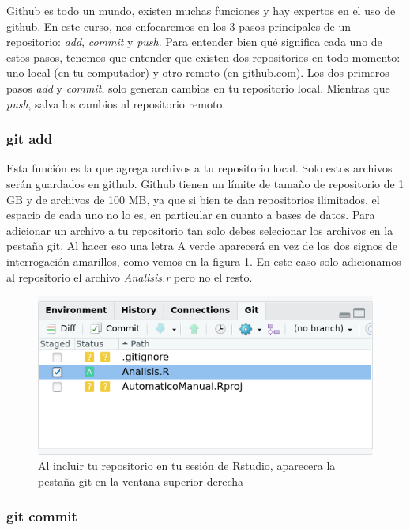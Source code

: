 \documentclass[]{book}
\begin{document}
Github es todo un mundo, existen muchas funciones y hay expertos en el
uso de github. En este curso, nos enfocaremos en los 3 pasos principales
de un repositorio: \emph{add}, \emph{commit} y \emph{push}. Para
entender bien qué significa cada uno de estos pasos, tenemos que
entender que existen dos repositorios en todo momento: uno local (en tu
computador) y otro remoto (en github.com). Los dos primeros pasos
\emph{add} y \emph{commit}, solo generan cambios en tu repositorio
local. Mientras que \emph{push}, salva los cambios al repositorio
remoto.

\hypertarget{git-add}{%
\subsubsection{git add}\label{git-add}}

Esta función es la que agrega archivos a tu repositorio local. Solo
estos archivos serán guardados en github. Github tienen un límite de
tamaño de repositorio de 1 GB y de archivos de 100 MB, ya que si bien te
dan repositorios ilimitados, el espacio de cada uno no lo es, en
particular en cuanto a bases de datos. Para adicionar un archivo a tu
repositorio tan solo debes selecionar los archivos en la pestaña git. Al
hacer eso una letra A verde aparecerá en vez de los dos signos de
interrogación amarillos, como vemos en la figura \ref{fig:Add}. En este
caso solo adicionamos al repositorio el archivo \emph{Analisis.r} pero
no el resto.

\begin{figure}

{\centering \includegraphics[width=0.8\linewidth]{GitAdd} 

}

\caption{Al incluir tu repositorio en tu sesión de Rstudio, aparecera la pestaña git en la ventana superior derecha}\label{fig:Add}
\end{figure}

\hypertarget{git-commit}{%
\subsubsection{git commit}\label{git-commit}}
\end{document}
